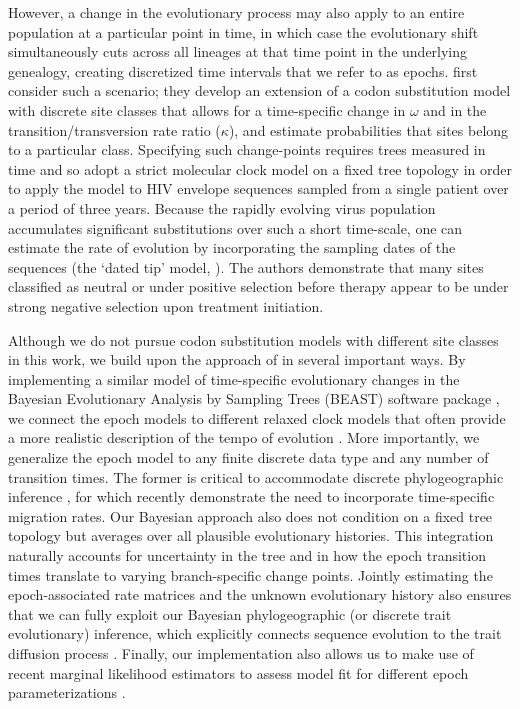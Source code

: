 However, a change in the evolutionary process may also apply to an entire population at a particular point in time, in which case the evolutionary shift simultaneously cuts across all lineages at that time point in the underlying genealogy, creating discretized time intervals that we refer to as epochs.
\citet{Goode2008} first consider such a scenario; they develop an extension of a codon substitution model with discrete site classes that allows for a time-specific change in $\omega$ and in the transition/transversion rate ratio ($\kappa$), and estimate probabilities that sites belong to a particular class.
Specifying such change-points requires trees measured in time and so \citet{Goode2008} adopt a strict molecular clock model on a fixed tree topology in order to apply the model to HIV envelope sequences sampled from a single patient over a period of three years.  
Because the rapidly evolving virus population accumulates significant substitutions over such a short time-scale, one can estimate the rate of evolution by incorporating the sampling dates of the sequences (the `dated tip' model, \citet{Rambaut2000}).
The authors demonstrate that many sites classified as neutral or under positive selection before therapy appear to be under strong negative selection upon treatment initiation.

Although we do not pursue codon substitution models with different site classes in this work, we build upon the approach of \citet{Goode2008} in several important ways.
By implementing a similar model of time-specific evolutionary changes in the Bayesian Evolutionary Analysis by Sampling Trees (BEAST) software package \citep{Drummond2012}, 
we connect the epoch models to different relaxed clock models that often provide a more realistic description of the tempo of evolution \citep{Drummond2006, Drummond2010}.
More importantly, we generalize the epoch model to any finite discrete data type and any number of transition times.
The former is critical to accommodate discrete phylogeographic inference \citep{Lemey2009}, for which \citet{Bahl2011} recently demonstrate the need to incorporate time-specific migration rates.
Our Bayesian approach also does not condition on a fixed tree topology but averages over all plausible evolutionary histories.  
This integration naturally accounts for uncertainty in the tree and in how the epoch transition times translate to varying branch-specific change points.
Jointly estimating the epoch-associated rate matrices and the unknown evolutionary history also ensures that we can fully exploit our Bayesian phylogeographic (or discrete trait evolutionary) inference, which explicitly connects sequence evolution to the trait diffusion process \citep{Lemey2009}.
Finally, our implementation also allows us to make use of recent marginal likelihood estimators to assess model fit for different epoch parameterizations \citep{Baele2012}.

